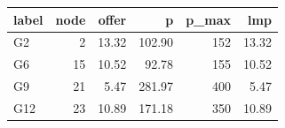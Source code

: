 \begin{tabular}{lrrrrr}
\toprule
label & node & offer & p & p\_max & lmp \\
\midrule
G2 & 2 & 13.32 & 102.90 & 152 & 13.32 \\
G6 & 15 & 10.52 & 92.78 & 155 & 10.52 \\
G9 & 21 & 5.47 & 281.97 & 400 & 5.47 \\
G12 & 23 & 10.89 & 171.18 & 350 & 10.89 \\
\bottomrule
\end{tabular}
